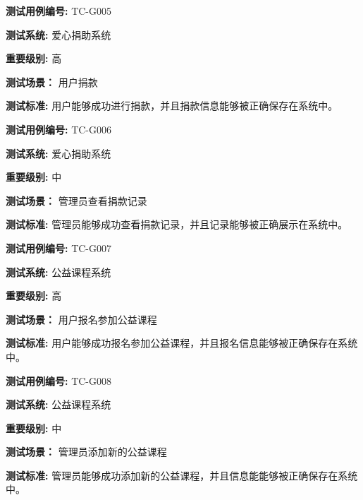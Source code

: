 \begin{framed} \textbf{测试用例编号:} TC-G005

\textbf{测试系统:} 爱心捐助系统

\textbf{重要级别:} 高

\textbf{测试场景：} 用户捐款

\textbf{测试标准:} 用户能够成功进行捐款，并且捐款信息能够被正确保存在系统中。

\begin{center}  \end{center} \end{framed}

\begin{framed} \textbf{测试用例编号:} TC-G006

\textbf{测试系统:} 爱心捐助系统

\textbf{重要级别:} 中

\textbf{测试场景：} 管理员查看捐款记录

\textbf{测试标准:} 管理员能够成功查看捐款记录，并且记录能够被正确展示在系统中。

\begin{center}  \end{center} \end{framed}

\begin{framed} \textbf{测试用例编号:} TC-G007

\textbf{测试系统:} 公益课程系统

\textbf{重要级别:} 高

\textbf{测试场景：} 用户报名参加公益课程

\textbf{测试标准:} 用户能够成功报名参加公益课程，并且报名信息能够被正确保存在系统中。

\begin{center}  \end{center} \end{framed}

\begin{framed} \textbf{测试用例编号:} TC-G008

\textbf{测试系统:} 公益课程系统

\textbf{重要级别:} 中

\textbf{测试场景：} 管理员添加新的公益课程

\textbf{测试标准:} 管理员能够成功添加新的公益课程，并且信息能能够被正确保存在系统中。

\begin{center}  \end{center} \end{framed}

